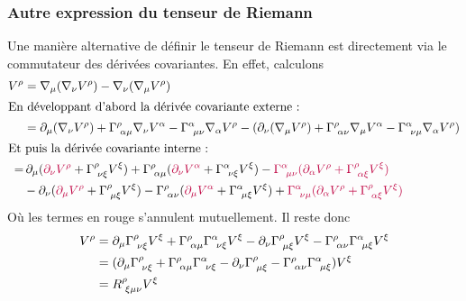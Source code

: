 \subsubsection{Autre expression du tenseur de Riemann}
Une manière alternative de définir le tenseur de Riemann est directement via le commutateur des dérivées covariantes. En effet, calculons
\begin{align*}
    [\nabla_{\mu}, \nabla_{\nu}]V^{\rho} &= \nabla_{\mu}(\nabla_{\nu}V^{\rho}) - \nabla_{\nu}(\nabla_{\mu}V^{\rho})\\
    \intertext{En développant d'abord la dérivée covariante externe :}
    &= \partial_{\mu}(\nabla_{\nu}V^{\rho}) + \Gamma\indices{^{\rho}_{\!\alpha \mu}}\nabla_{\nu}V^{\alpha}-\Gamma\indices{^{\alpha}_{\!\mu \nu}}\nabla_{\alpha}V^{\rho} -(\partial_{\nu}(\nabla_{\mu}V^{\rho}) + \Gamma\indices{^{\rho}_{\!\alpha \nu}}\nabla_{\mu}V^{\alpha} - \Gamma\indices{^{\alpha}_{\!\nu \mu}} \nabla_{\alpha}V^{\rho})\\
    \intertext{Et puis la dérivée covariante interne :}
    =&\, \partial_{\mu}(\textcolor{purple}{\partial_{\nu}V^{\rho}} + \Gamma\indices{^{\rho}_{\!\nu \xi}} V^{\xi}) + \Gamma\indices{^{\rho}_{\!\alpha \mu}}(\textcolor{purple}{\partial_{\nu}V^{\alpha}}+\Gamma\indices{^{\alpha}_{\!\nu \xi}} V^{\xi}) - \textcolor{purple}{\Gamma\indices{^{\alpha}_{\!\mu \nu}}(\partial_{\alpha}V^{\rho} + \Gamma\indices{^{\rho}_{\!\alpha \xi}} V^{\xi})} \\
    &-\partial_{\nu}(\textcolor{purple}{\partial_{\mu}V^{\rho}} + \Gamma\indices{^{\rho}_{\!\mu \xi}}V^{\xi}) - \Gamma\indices{^{\rho}_{\!\alpha \nu}}(\textcolor{purple}{\partial_{\mu}V^{\alpha}}+\Gamma\indices{^{\alpha}_{\!\mu \xi}} V^{\xi}) +\textcolor{purple}{\Gamma\indices{^{\alpha}_{\!\nu \mu}}(\partial_{\alpha}V^{\rho} + \Gamma\indices{^{\rho}_{\!\alpha \xi}}V^{\xi})}
\end{align*}
Où les termes en rouge s'annulent mutuellement. Il reste donc
\begin{align}
    [\nabla_{\mu}, \nabla_{\nu}]V^{\rho} &= \partial_{\mu}\Gamma\indices{^{\rho}_{\!\nu \xi}}V^{\xi} + \Gamma\indices{^{\rho}_{\!\alpha \mu}}\Gamma\indices{^{\alpha}_{\!\nu \xi}}V^{\xi} -\partial_{\nu}\Gamma\indices{^{\rho}_{\!\mu \xi}}V^{\xi} -\Gamma\indices{^{\rho}_{\!\alpha \nu}}\Gamma\indices{^{\alpha}_{\!\mu \xi}}V^{\xi}\\
    &= (\partial_{\mu}\Gamma\indices{^{\rho}_{\!\nu \xi}} + \Gamma\indices{^{\rho}_{\!\alpha \mu}}\Gamma\indices{^{\alpha}_{\!\nu \xi}} - \partial_{\nu}\Gamma\indices{^{\rho}_{\!\mu \xi}} - \Gamma\indices{^{\rho}_{\!\alpha \nu}}\Gamma\indices{^{\alpha}_{\!\mu \xi}})V^{\xi}\\
    \label{eq: Riemann commutateur}
    &= R\indices{^{\rho}_{\!\xi \mu \nu}}V^{\xi}
\end{align}
